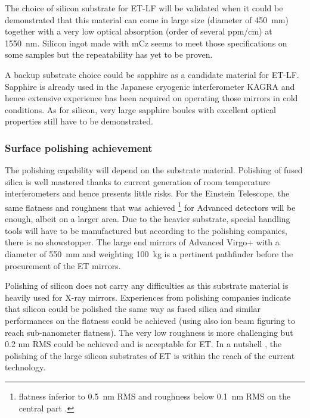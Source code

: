 The choice of silicon substrate for ET-LF will be validated when it could be demonstrated that this material can come in large size (diameter of 450~mm) together with a very low optical absorption (order of several ppm/cm) at 1550~nm. Silicon ingot made with mCz seems to meet those specifications on some samples but the repeatability has yet to be proven.

A backup substrate choice could be sapphire as a candidate material for ET-LF. Sapphire is already used in the Japanese cryogenic interferometer KAGRA and hence extensive experience has been acquired on operating those mirrors \cite{Akutsu_2019} in cold conditions. As for silicon, very large sapphire boules  with excellent optical properties still have to be demonstrated.

\subsubsection{Surface polishing achievement}

The polishing capability will depend on the substrate material. Polishing of fused silica is well mastered thanks to current generation of room temperature interferometers and hence presents little risks. For the Einstein Telescope, the same flatness and roughness that was achieved \footnote{flatness inferior to 0.5~nm RMS and roughness below 0.1~nm RMS on the central part \cite{pinard2017mirrors}.} for Advanced detectors will be enough, albeit on a larger area. Due to the heavier substrate, special handling tools will have to be manufactured but according to the polishing companies, there is no showstopper. The large end mirrors of Advanced Virgo+ with a diameter of 550~mm and weighting 100~kg is  a pertinent pathfinder before the procurement of the ET mirrors.

Polishing of silicon does not carry any difficulties as this substrate material is heavily used for X-ray mirrors. Experiences from polishing companies indicate that silicon could be polished the same way as fused silica and similar performances on the flatness could be achieved (using also ion beam figuring to reach sub-nanometer flatness). The very low roughness is more challenging but 0.2 nm RMS could be achieved and is acceptable for ET. In a nutshell   , the polishing of the large silicon substrates of ET is within the reach of the current technology.

